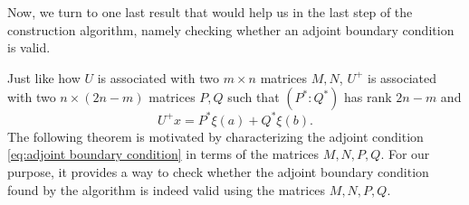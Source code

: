\documentclass[11pt, oneside, a4paper]{article}
\begin{document}
Now, we turn to one last result that would help us in the last step of the construction algorithm, namely checking whether an adjoint boundary condition is valid.

Just like how $U$ is associated with two $m\times n$ matrices $M, N$, $U^+$ is associated with two $n\times (2n-m)$ matrices $P, Q$ such that $(P^*:Q^*)$ has rank $2n-m$ and
\begin{equation}\label{eq:U^+x in P* Q*}
    U^+x = P^*\xi(a) + Q^*\xi(b).
\end{equation}
The following theorem is motivated by characterizing the adjoint condition \eqref{eq:adjoint boundary condition} in terms of the matrices $M, N, P, Q$. For our purpose, it provides a way to check whether the adjoint boundary condition found by the algorithm is indeed valid using the matrices $M, N, P, Q$.
\end{document}
